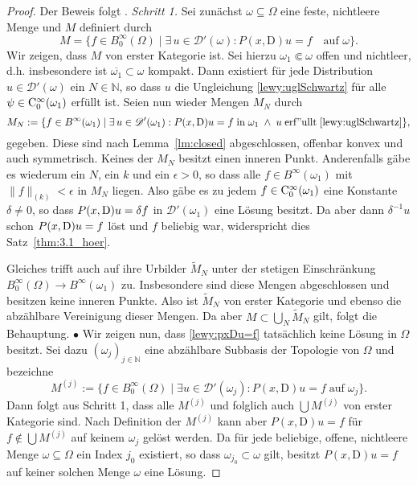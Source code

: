 \begin{proof} Der Beweis folgt {\cite[Theorem 3.2]{Hormander:1960a}}.
{\sl Schritt 1.}
Sei zunächst $\omega\subseteq\Omega$ eine feste, nichtleere Menge und $M$ definiert durch
\begin{equation}
M=\{f\in B_0^\infty(\Omega)\mid \exists\,u\in\mathscr{D}'(\omega) : P(x,\mathrm{D})u=f\quad \text{auf $\omega$}\}.
\end{equation}
Wir zeigen, dass $M$ von erster Kategorie ist.  Sei hierzu $\omega_1\Subset\omega$ offen und nichtleer, d.h. insbesondere ist $\overline{\omega_1}\subset\omega$ kompakt. Dann existiert für jede Distribution $u\in\mathscr{D}'(\omega)$ ein $N\in\mathbb{N}$, so dass $u$ die Ungleichung \eqref{lewy:uglSchwartz}
für alle $\psi\in \mathrm C_0^\infty(\omega_1)$ erfüllt ist. Seien nun wieder Mengen $M_N$ durch
\begin{equation}
M_N:= \{f\in B^\infty(\omega_1)\mid \exists\,u\in\mathscr D'(\omega_1): P(x,\mathrm{D})u=f\;\mathrm{in}\;\omega_1\;\wedge\; u\mathrm{\;erf"ullt\;}\eqref{lewy:uglSchwartz}\},
\end{equation}
gegeben. Diese sind nach Lemma~\ref{lm:closed} abgeschlossen, offenbar konvex und auch symmetrisch. 
Keines der $M_N$ besitzt einen inneren Punkt. 
Anderenfalls gäbe es wiederum ein $N$, ein $k$ und ein $\epsilon>0$, so dass alle $f\in B^\infty(\omega_1)$ mit
$\|f\|_{(k)}<\epsilon$ in $M_N$ liegen. Also gäbe es zu jedem $f\in\mathrm C_0^\infty(\omega_1)$ eine Konstante $\delta\ne0$, so dass $P(x,\mathrm D)u=\delta f$ in $\mathscr D'(\omega_1)$ eine L\"osung besitzt. Da aber dann $\delta^{-1}u$ schon $P(x,\mathrm D)u=f$ löst und $f$ beliebig war, widerspricht dies Satz~\ref{thm:3.1_hoer}. 

Gleiches trifft auch auf ihre Urbilder $\widetilde M_N$ unter der stetigen Einschränkung $B^\infty_0(\Omega)\to B^\infty(\omega_1)$ zu. Insbesondere sind diese Mengen abgeschlossen und besitzen keine inneren Punkte. Also ist $\widetilde M_N$ von erster Kategorie und ebenso die abzählbare Vereinigung dieser Mengen. Da aber $M\subset \bigcup_N \widetilde M_N$ gilt, folgt die  Behauptung.
$\bullet$
Wir zeigen nun, dass \eqref{lewy:pxDu=f} tatsächlich keine Lösung in $\Omega$ besitzt. Sei dazu $(\omega_j)_{j\in\mathbb{N}}$ eine abzählbare Subbasis der Topologie von $\Omega$ und bezeichne
\begin{equation}
M^{(j)}:=\{f\in B_0^\infty(\Omega)\mid \exists u\in\mathscr{D}'(\omega_j): P(x,\mathrm{D})u=f\;\mathrm{auf\;}\omega_j\}.
\end{equation}
Dann folgt aus Schritt 1, dass alle $M^{(j)}$ und folglich auch $\bigcup M^{(j)}$ von erster Kategorie sind. Nach Definition der $M^{(j)}$ kann aber $P(x,\mathrm{D})u=f$ für $f\not\in  \bigcup M^{(j)}$ auf keinem $\omega_j$ gelöst werden. Da für jede beliebige, offene, nichtleere Menge $\omega\subseteq\Omega$ ein Index $j_0$ existiert, so dass $\omega_{j_0}\subset\omega$ gilt, besitzt $P(x,\mathrm{D})u=f$ auf keiner solchen Menge $\omega$ eine Lösung. 
\end{proof}



